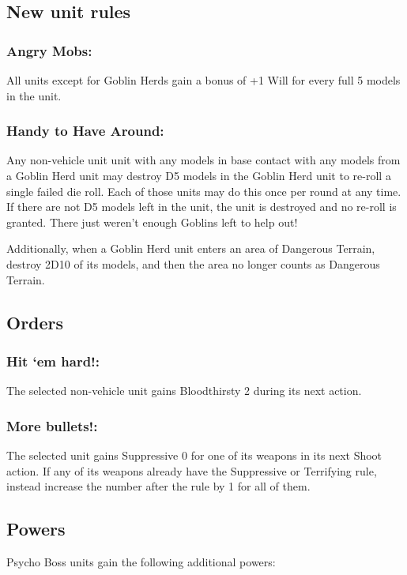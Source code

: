 \subsection*{New unit rules}

\subsubsection*{Angry Mobs:} All units except for Goblin Herds gain a bonus of +1 Will for every full 5 models in the unit.

\subsubsection*{Handy to Have Around:} Any non-vehicle unit unit with any models in base contact with any models from a Goblin Herd unit may destroy D5 models in the Goblin Herd unit to re-roll a single failed die roll. Each of those units may do this once per round at any time. If there are not D5 models left in the unit, the unit is destroyed and no re-roll is granted. There just weren't enough Goblins left to help out!

Additionally, when a Goblin Herd unit enters an area of Dangerous Terrain, destroy 2D10 of its models, and then the area no longer counts as Dangerous Terrain.

\subsection*{Orders}
\subsubsection*{Hit ‘em hard!:} The selected non-vehicle unit gains Bloodthirsty 2 during its next action.

\subsubsection*{More bullets!:} The selected unit gains Suppressive 0 for one of its weapons in its next Shoot action. If any of its weapons already have the Suppressive or Terrifying rule, instead increase the number after the rule by 1 for all of them.

\subsection*{Powers}

Psycho Boss units gain the following additional powers:

